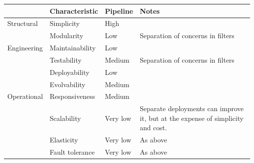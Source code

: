 \begin{table}[h!]
  \renewcommand{\arraystretch}{1.4}
  \centering
  \begin{tabularx}{\textwidth}{l l l X}
    \toprule
                & \textbf{Characteristic} & \textbf{Pipeline} & \textbf{Notes}                                                                  \\
    \midrule
    Structural  & Simplicity              & High              &                                                                                 \\
                & Modularity              & Low               & Separation of concerns in filters                                               \\
    \midrule
    Engineering & Maintainability         & Low               &                                                                                 \\
                & Testability             & Medium            & Separation of concerns in filters                                               \\
                & Deployability           & Low               &                                                                                 \\
                & Evolvability            & Medium            &                                                                                 \\
    \midrule
    Operational & Responsiveness          & Medium            &                                                                                 \\
                & Scalability             & Very low          & Separate deployments can improve it, but at the expense of simplicity and cost. \\
                & Elasticity              & Very low          & As above                                                                        \\
                & Fault tolerance         & Very low          & As above                                                                        \\
    \bottomrule
  \end{tabularx}
\end{table}

